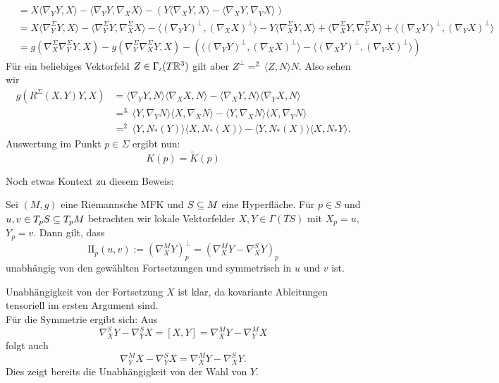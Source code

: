 \begin{beweis}
\begin{align}
&= X \langle \nabla_Y Y, X \rangle - \langle \nabla_YY, \nabla_XX \rangle - \left( Y \langle \nabla_XY, X\rangle - \langle \nabla_XY, \nabla_YX \rangle \right)\\
&= X \langle \nabla_Y^\Sigma Y, X \rangle - \langle \nabla_Y^\Sigma Y, \nabla_X^\Sigma X \rangle- \langle (\nabla_Y Y)^{\perp}, (\nabla_X X)^{\perp} \rangle - Y \langle \nabla_X^\Sigma  Y, X \rangle + \langle \nabla_X^\Sigma Y, \nabla_Y^\Sigma X \rangle + \langle (\nabla_XY)^{\perp}, (\nabla_YX)^{\perp} \rangle\\
&= g(\nabla_X^\Sigma \nabla_Y^\Sigma Y, X) - g(\nabla_Y^\Sigma \nabla_X^\Sigma Y, X) - \left( \langle (\nabla_YY)^{\perp},(\nabla_XX)^{\perp} \rangle - \langle (\nabla_XY)^{\perp}, (\nabla_YX)^{\perp} \rangle \right)
\end{align}
Für ein beliebiges Vektorfeld $Z \in \Gamma_\iota (T\mathbb{R}^3)$ gilt aber $Z^{\perp} =^{2.} \langle Z,N\rangle N$. Also sehen wir
\begin{align}
g(R^\Sigma(X,Y)Y,X) &= \langle  \nabla_YY,N\rangle \langle \nabla_XX, N\rangle - \langle \nabla_XY,N \rangle \langle \nabla_YX,N \rangle\\
&=^{3.}  \langle Y, \nabla_Y N \rangle \langle X, \nabla_X N \rangle - \langle Y, \nabla_X N \rangle \langle X, \nabla_Y N \rangle\\
&=^{2.} \langle Y, N_\ast(Y) \rangle \langle X, N_\ast(X) \rangle - \langle Y, N_\ast (X) \rangle \langle X, N_\ast Y \rangle.
\end{align}
Auswertung im Punkt $p \in \Sigma$ ergibt nun: 
\begin{equation}
K(p) = \tilde{K}(p)
\end{equation}
\end{beweis}
Noch etwas Kontext zu diesem Beweis: 
\begin{satz}{}{}
Sei $(M,g)$ eine Riemannsche MFK und $S \subseteq M$ eine Hyperfläche. Für $p \in S$ und $u,v \in T_pS \subseteq T_pM$ betrachten wir lokale Vektorfelder $X,Y \in \Gamma(TS)$ mit $X_p = u$, $Y_p =v$. Dann gilt, dass 
\begin{equation}
\text{II}_p(u,v) := (\nabla_X^MY)_p^{\perp} = \left( \nabla_X^M Y - \nabla_X^S Y \right)_p
\end{equation}
unabhängig von den gewählten Fortsetzungen und symmetrisch in $u$ und $v$ ist.
\end{satz}
\begin{beweis}
Unabhängigkeit von der Fortsetzung $X$ ist klar, da kovariante Ableitungen tensoriell im ersten Argument sind.\\
Für die Symmetrie ergibt sich:
Aus
\begin{equation}
\nabla_X^S Y-\nabla_Y^S X = [X,Y] = \nabla_X^M Y - \nabla_Y^M X
\end{equation}
folgt auch 
\begin{equation}
\nabla_Y^MX-\nabla_Y^SX = \nabla_X^MY-\nabla_X^S Y.
\end{equation}
Dies zeigt bereits die Unabhängigkeit von der Wahl von $Y$.
\end{beweis}
